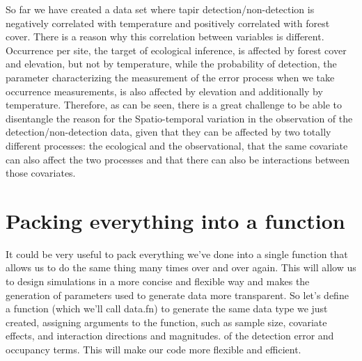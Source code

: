 \documentclass[
]{book}
\begin{document}
So far we have created a data set where tapir detection/non-detection is negatively correlated with temperature and positively correlated with forest cover. There is a reason why this correlation between variables is different. Occurrence per site, the target of ecological inference, is affected by forest cover and elevation, but not by temperature, while the probability of detection, the parameter characterizing the measurement of the error process when we take occurrence measurements, is also affected by elevation and additionally by temperature. Therefore, as can be seen, there is a great challenge to be able to disentangle the reason for the Spatio-temporal variation in the observation of the detection/non-detection data, given that they can be affected by two totally different processes: the ecological and the observational, that the same covariate can also affect the two processes and that there can also be interactions between those covariates.

\hypertarget{function1}{%
\chapter{Packing everything into a function}\label{function1}}

It could be very useful to pack everything we've done into a single function that allows us to do the same thing many times over and over again. This will allow us to design simulations in a more concise and flexible way and makes the generation of parameters used to generate data more transparent. So let's define a function (which we'll call data.fn) to generate the same data type we just created, assigning arguments to the function, such as sample size, covariate effects, and interaction directions and magnitudes. of the detection error and occupancy terms. This will make our code more flexible and efficient.
\end{document}
